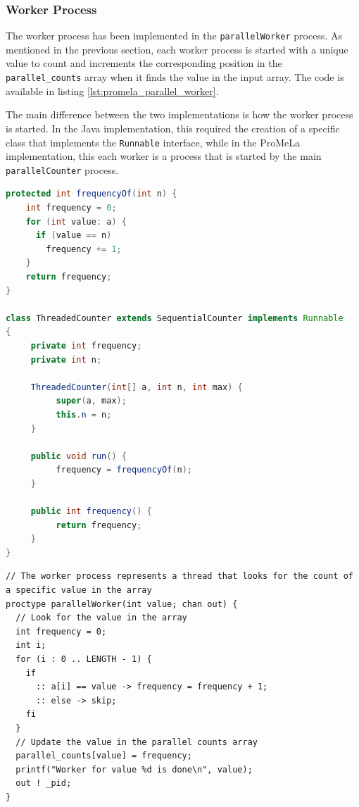 \documentclass[a4paper, 11pt]{article}
\begin{document}
\subsubsection{Worker Process}

The worker process has been implemented in the \texttt{parallelWorker} process. As mentioned in the previous section, each worker process is started with a unique value to count and increments the corresponding position in the \texttt{parallel\_counts} array when it finds the value in the input array. The code is available in listing \ref{lst:promela_parallel_worker}.

The main difference between the two implementations is how the worker process is started. In the Java implementation, this required the creation of a specific class that implements the \texttt{Runnable} interface, while in the ProMeLa implementation, this each worker is a process that is started by the main \texttt{parallelCounter} process.

\begin{minipage}[t]{0.45\textwidth}
	\begin{lstlisting}[language=Java, caption={Java parallel worker thread implementation leveraging Threads}, captionpos=b, label={lst:java_parallel_worker}]
protected int frequencyOf(int n) {
    int frequency = 0;
    for (int value: a) {
      if (value == n)
        frequency += 1;
    }
    return frequency;
}

class ThreadedCounter extends SequentialCounter implements Runnable
{
	 private int frequency;
	 private int n;
	 
	 ThreadedCounter(int[] a, int n, int max) {
		  super(a, max);
		  this.n = n;
	 }

	 public void run() {
		  frequency = frequencyOf(n);
	 }

	 public int frequency() {
		  return frequency;
	 }
}
  \end{lstlisting}
\end{minipage}\hfill
\begin{minipage}[t]{0.45\textwidth}
	\begin{lstlisting}[language=Promela, caption={ProMeLa parallel frequency counter - worker process}, captionpos=b, breaklines=true, label={lst:promela_parallel_worker}]
// The worker process represents a thread that looks for the count of a specific value in the array
proctype parallelWorker(int value; chan out) {
  // Look for the value in the array
  int frequency = 0;
  int i;
  for (i : 0 .. LENGTH - 1) {
    if
      :: a[i] == value -> frequency = frequency + 1;
      :: else -> skip;
    fi
  }
  // Update the value in the parallel counts array
  parallel_counts[value] = frequency;
  printf("Worker for value %d is done\n", value);
  out ! _pid;
}
  \end{lstlisting}
\end{minipage}
\end{document}

